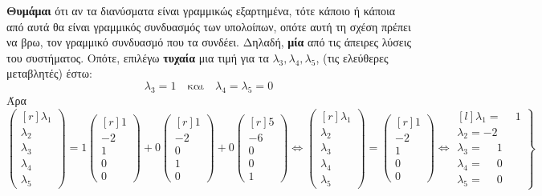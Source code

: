 \documentclass[a4paper,table]{report}
\begin{document}
\textbf{Θυμάμαι} ότι αν τα διανύσματα είναι γραμμικώς εξαρτημένα, τότε κάποιο ή 
κάποια από αυτά θα είναι γραμμικός συνδυασμός των υπολοίπων, οπότε αυτή τη σχέση 
πρέπει να βρω, τον γραμμικό συνδυασμό που τα συνδέει. Δηλαδή, \textbf{μία} από τις 
άπειρες λύσεις του συστήματος. Οπότε, επιλέγω \textbf{τυχαία} μια τιμή για τα 
$ \lambda _{3}, \lambda _{4}, \lambda _{5} $, (τις ελεύθερες μεταβλητές) έστω: 
\[
  \lambda _{3} = 1 \quad \text{και} \quad \lambda _{4} = \lambda _{5} = 0 
\] 
Άρα 
\[
  \begin{pmatrix*}[r] \lambda _{1} \\ \lambda _{2} \\ \lambda _{3} \\ \lambda _{4} \\
  \lambda _{5}  \end{pmatrix*} = 1
  \begin{pmatrix*}[r] 1 \\ -2 \\ 1 \\ 0 \\ 0  \end{pmatrix*} + 0
  \begin{pmatrix*}[r] 1 \\ -2 \\ 0 \\ 1 \\ 0  \end{pmatrix*} + 0
  \begin{pmatrix*}[r] 5 \\ -6 \\ 0 \\ 0 \\ 1  \end{pmatrix*} \Leftrightarrow 
  \begin{pmatrix*}[r] \lambda _{1} \\ \lambda _{2} \\ \lambda _{3} \\ \lambda _{4} \\
  \lambda _{5}  \end{pmatrix*} = 
  \begin{pmatrix*}[r] 1 \\ -2 \\ 1 \\ 0 \\ 0  \end{pmatrix*} \Leftrightarrow 
  \left.
    \begin{matrix*}[l]
      \lambda _{1} = \phantom{-} 1 \\
      \lambda _{2} = -2 \\
      \lambda _{3} = \phantom{-}1 \\
      \lambda _{4} = \phantom{-}0 \\
      \lambda _{5} = \phantom{-}0 
    \end{matrix*} 
  \right\} 
\] 
\end{document}

